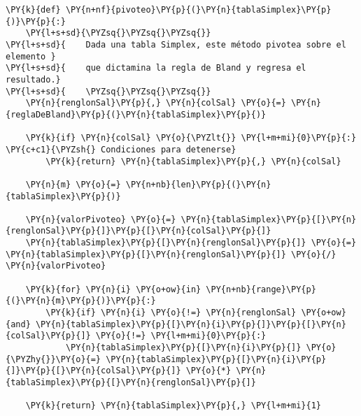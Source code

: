 \begin{tcolorbox}[breakable, size=fbox, boxrule=1pt, pad at break*=1mm,colback=cellbackground, colframe=cellborder]
\begin{Verbatim}[commandchars=\\\{\}]
\PY{k}{def} \PY{n+nf}{pivoteo}\PY{p}{(}\PY{n}{tablaSimplex}\PY{p}{)}\PY{p}{:}
    \PY{l+s+sd}{\PYZsq{}\PYZsq{}\PYZsq{}}
\PY{l+s+sd}{    Dada una tabla Simplex, este método pivotea sobre el elemento }
\PY{l+s+sd}{    que dictamina la regla de Bland y regresa el resultado.}
\PY{l+s+sd}{    \PYZsq{}\PYZsq{}\PYZsq{}}
    \PY{n}{renglonSal}\PY{p}{,} \PY{n}{colSal} \PY{o}{=} \PY{n}{reglaDeBland}\PY{p}{(}\PY{n}{tablaSimplex}\PY{p}{)}
    
    \PY{k}{if} \PY{n}{colSal} \PY{o}{\PYZlt{}} \PY{l+m+mi}{0}\PY{p}{:} \PY{c+c1}{\PYZsh{} Condiciones para detenerse}
        \PY{k}{return} \PY{n}{tablaSimplex}\PY{p}{,} \PY{n}{colSal}
    
    \PY{n}{m} \PY{o}{=} \PY{n+nb}{len}\PY{p}{(}\PY{n}{tablaSimplex}\PY{p}{)}
    
    \PY{n}{valorPivoteo} \PY{o}{=} \PY{n}{tablaSimplex}\PY{p}{[}\PY{n}{renglonSal}\PY{p}{]}\PY{p}{[}\PY{n}{colSal}\PY{p}{]}
    \PY{n}{tablaSimplex}\PY{p}{[}\PY{n}{renglonSal}\PY{p}{]} \PY{o}{=} \PY{n}{tablaSimplex}\PY{p}{[}\PY{n}{renglonSal}\PY{p}{]} \PY{o}{/} \PY{n}{valorPivoteo}
    
    \PY{k}{for} \PY{n}{i} \PY{o+ow}{in} \PY{n+nb}{range}\PY{p}{(}\PY{n}{m}\PY{p}{)}\PY{p}{:}
        \PY{k}{if} \PY{n}{i} \PY{o}{!=} \PY{n}{renglonSal} \PY{o+ow}{and} \PY{n}{tablaSimplex}\PY{p}{[}\PY{n}{i}\PY{p}{]}\PY{p}{[}\PY{n}{colSal}\PY{p}{]} \PY{o}{!=} \PY{l+m+mi}{0}\PY{p}{:}
            \PY{n}{tablaSimplex}\PY{p}{[}\PY{n}{i}\PY{p}{]} \PY{o}{\PYZhy{}}\PY{o}{=} \PY{n}{tablaSimplex}\PY{p}{[}\PY{n}{i}\PY{p}{]}\PY{p}{[}\PY{n}{colSal}\PY{p}{]} \PY{o}{*} \PY{n}{tablaSimplex}\PY{p}{[}\PY{n}{renglonSal}\PY{p}{]}
    
    \PY{k}{return} \PY{n}{tablaSimplex}\PY{p}{,} \PY{l+m+mi}{1}
\end{Verbatim}
\end{tcolorbox}

